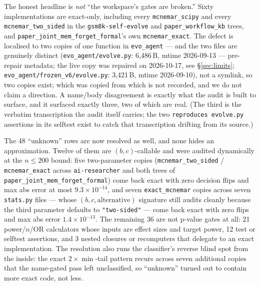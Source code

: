 \documentclass[10pt]{article}
\newcommand{\code}[1]{\texttt{#1}}
\begin{document}
The honest headline is \emph{not} ``the workspace's gates are broken.'' Sixty
implementations are exact-only, including every \code{mcnemar\_scipy} and
every \code{mcnemar\_two\_sided} in the \code{gsm8k-self-evolve} and
\code{paper\_workflow\_kb} trees, and \code{paper\_joint\_mem\_forget\_formal}'s
own \code{mcnemar\_exact}. The defect is localised to two copies of one
function in \code{evo\_agent} --- and the two files are genuinely distinct
(\code{evo\_agent/evolve.py}: 6{,}486\,B, mtime 2026-09-13 --- pre-repair
metadata; the live copy was repaired on 2026-10-17, see \S\ref{sec:limits};
\code{evo\_agent/frozen\_v6/evolve.py}: 3{,}421\,B, mtime 2026-09-10), not a
symlink, so two copies exist; which was copied from which is not recorded, and
we do not claim a direction. A name/body disagreement is exactly what the
audit is built to surface, and it surfaced exactly three, two of which are
real. (The third is the verbatim transcription the audit itself carries; the
two \code{reproduces evolve.py} assertions in its selftest exist to catch that
transcription drifting from its source.)

The 48 ``unknown'' rows are now resolved as well, and none hides an
approximation. Twelve of them are $(b,c)$-callable and were audited
dynamically at the $n\le200$ bound: five two-parameter copies
(\code{mcnemar\_two\_sided} / \code{mcnemar\_exact} across
\code{ai-researcher} and both trees of
\code{paper\_joint\_mem\_\allowbreak forget\_formal})
come back exact with zero decision flips and max abs error at most
$9.3\times10^{-14}$, and seven \code{exact\_mcnemar} copies across seven
\code{stats.py} files --- whose $(b,c,\text{alternative})$ signature still
audits cleanly because the third parameter defaults to
\code{"two-sided"} --- come back exact with zero flips and max abs error
$1.4\times10^{-13}$. The remaining 36 are not p-value gates at all: 21
power/$n$/OR calculators whose inputs are effect sizes and target power,
12 test or selftest assertions, and 3 nested closures or recomputers that
delegate to an exact implementation. The resolution also runs the
classifier's reverse blind spot from the inside: the exact
$2\times\min$-tail pattern recurs across seven additional copies that the
name-gated pass left unclassified, so ``unknown'' turned out to contain
more exact code, not less.
\end{document}
